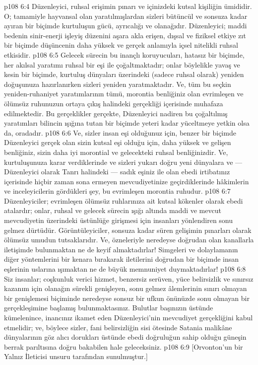 \vs p108 6:4 Düzenleyici, ruhsal erişimin pınarı ve içinizdeki kutsal kişiliğin ümididir. O; tamamiyle hayvansal olan yaratılmışlardan sizleri bütüncül ve sonsuza kadar ayıran bir biçimde kurtuluşun gücü, ayrıcalığı ve olanağıdır. Düzenleyici; maddi bedenin sinir\hyp{}enerji işleyiş düzenini aşara akla erişen, dışsal ve fiziksel etkiye zıt bir biçimde düşüncenin daha yüksek ve gerçek anlamıyla içsel nitelikli ruhsal etkisidir.
\vs p108 6:5 Gelecek sürecin bu inançlı koruyucuları, hatasız bir biçimde, her akılsal yaratımı ruhsal bir eşi ile çoğaltmaktadır; onlar böylelikle yavaş ve kesin bir biçimde, kurtuluş dünyaları üzerindeki (sadece ruhsal olarak) yeniden doğuşunuza hazırlanırken sizleri yeniden yaratmaktadır. Ve, tüm bu seçkin yeniden\hyp{}ruhaniyet yaratımlarının tümü, morontia benliğiniz olan evrimleşen ve ölümsüz ruhunuzun ortaya çıkış halindeki gerçekliği içerisinde muhafaza edilmektedir. Bu gerçeklikler gerçekte, Düzenleyici nadiren bu çoğaltılmış yaratımları bilincin ışığına tutan bir biçimde yeteri kadar yüceltmeye yetkin olsa da, oradadır.
\vs p108 6:6 Ve, sizler insan eşi olduğunuz için, benzer bir biçimde Düzenleyici gerçek olan sizin kutsal eşi olduğu için, daha yüksek ve gelişen benliğiniz, sizin daha iyi morontial ve gelecekteki ruhsal benliğinizdir. Ve, kurtuluşunuza karar verdiklerinde ve sizleri yukarı doğru yeni dünyalara ve --- Düzenleyici olarak Tanrı halindeki --- sadık eşiniz ile olan ebedi irtibatınız içerisinde hiçbir zaman sona ermeyen mevcudiyetinize geçirdiklerinde hâkimlerin ve inceleyicilerin gördükleri şey, bu evrimleşen morontia ruhudur.
\vs p108 6:7 Düzenleyiciler; evrimleşen ölümsüz ruhlarınıza ait kutsal kökenler olarak ebedi atalardır; onlar, ruhsal ve gelecek sürecin ışığı altında maddi ve mevcut mevcudiyetin üzerindeki üstünlüğe girişmesi için insanları yönlendiren sonu gelmez dürtüdür. Görüntüleyiciler, sonsuza kadar süren gelişimin pınarları olarak ölümsüz umudun tutsaklarıdır. Ve, özneleriyle neredeyse doğrudan olan kanallarla iletişimde bulunmaktan ne de keyif almaktadırlar! Simgeleri ve dolaylamanın diğer yöntemlerini bir kenara bırakarak iletilerini doğrudan bir biçimde insan eşlerinin uslarına ışımaktan ne de büyük memnuniyet duymaktadırlar!
\vs p108 6:8 Siz insanlar; coşkunluk verici hizmet, benzersiz serüven, yüce belirsizlik ve sınırsız kazanım için olanağın sürekli genişleyen, sonu gelmez âlemlerinin sınırı olmayan bir genişlemesi biçiminde neredeyse sonsuz bir ufkun önünüzde sonu olmayan bir gerçekleşimine başlamış bulunmaktasınız. Bulutlar başınızın üstünde kümelenince, inancınız ikamet eden Düzenleyici’nin mevcudiyet gerçekliğini kabul etmelidir; ve, böylece sizler, fani belirsizliğin sisi ötesinde Satania malikâne dünyalarının göz alıcı dorukları üstünde ebedi doğruluğun sahip olduğu güneşin berrak parıltısına doğru bakabilen hale geleceksiniz.
\vs p108 6:9 [Orvonton’un bir Yalnız İleticisi unsuru tarafından sunulmuştur.]
